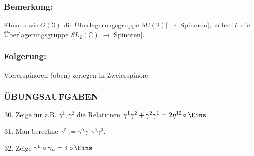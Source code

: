 \documentclass[twoside,a4paper]{scrartcl}
\newcommand{\C}{\mathbb{C}}
\renewcommand{\1}{\mathds{1}}
\newcommand{\ra}{\rightarrow}
\renewcommand{\C}{\mathbb{C}}
\begin{document}
\subsubsection*{Bemerkung:}
Ebenso wie $O(3)$ die Überlagerungsgruppe $SU(2)[\ra$ Spinoren$]$, so hat $L$ die Überlagerungsgruppe $SL_2(\C)[\ra$ Spinoren$]$.
\subsubsection*{Folgerung:}
Viererspinoren (oben) zerlegen in Zweierspinore.

\subsubsection*{ÜBUNGSAUFGABEN}
\begin{enumerate}
\setcounter{enumi}{29}
\item Zeige für z.B. $\gamma^1, \gamma^2$ die Relationen $\gamma^1\gamma^2+\gamma^2\gamma^1=2\eta^{12} \circ \Eins$.
\item Man berechne $\gamma^5:=\gamma^0\gamma^1\gamma^2\gamma^3$.
\item Zeige $\gamma^\mu\circ \gamma_\mu=4 \circ \Eins$
\end{enumerate}
\end{document}
